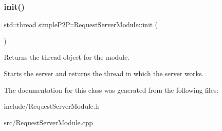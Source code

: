 \subsubsection{\texorpdfstring{init()}{init()}}
{\footnotesize\ttfamily std\+::thread simple\+P2\+P\+::\+Request\+Server\+Module\+::init (\begin{DoxyParamCaption}{ }\end{DoxyParamCaption})}



Returns the thread object for the module. 

Starts the server and returns the thread in which the server works. 

The documentation for this class was generated from the following files\+:\begin{DoxyCompactItemize}
\item 
include/Request\+Server\+Module.\+h\item 
src/Request\+Server\+Module.\+cpp\end{DoxyCompactItemize}
